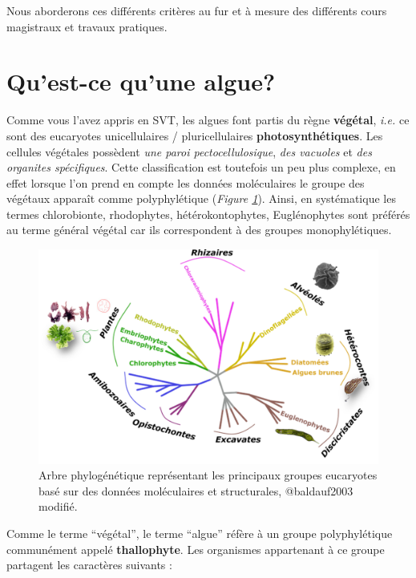 \documentclass[
]{book}
\begin{document}
Nous aborderons ces différents critères au fur et à mesure des différents cours magistraux et travaux pratiques.

\hypertarget{quest-ce-quune-algue}{%
\section{Qu'est-ce qu'une algue?}\label{quest-ce-quune-algue}}

Comme vous l'avez appris en SVT, les algues font partis du règne \textbf{végétal}, \emph{i.e.} ce sont des eucaryotes unicellulaires / pluricellulaires \textbf{photosynthétiques}. Les cellules végétales possèdent \emph{une paroi pectocellulosique}, \emph{des vacuoles} et \emph{des organites spécifiques}. Cette classification est toutefois un peu plus complexe, en effet lorsque l'on prend en compte les données moléculaires le groupe des végétaux apparaît comme polyphylétique (\emph{Figure \ref{fig:arbre-phylo}}). Ainsi, en systématique les termes chlorobionte, rhodophytes, hétérokontophytes, Euglénophytes sont préférés au terme général végétal car ils correspondent à des groupes monophylétiques.

\begin{figure}

{\centering \includegraphics{images/arbre_phylogenetique} 

}

\caption{Arbre phylogénétique représentant les principaux groupes eucaryotes basé sur des données moléculaires et structurales, @baldauf2003 modifié.}\label{fig:arbre-phylo}
\end{figure}

Comme le terme ``végétal'', le terme ``algue'' réfère à un groupe polyphylétique communément appelé \textbf{thallophyte}. Les organismes appartenant à ce groupe partagent les caractères suivants :
\end{document}
